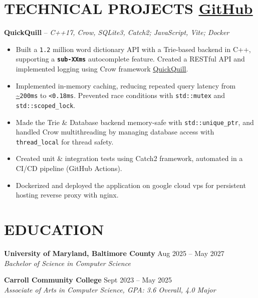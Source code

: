 \documentclass[11pt]{article}
\begin{document}
\section*{
TECHNICAL PROJECTS 
{\normalfont\normalsize\color{black}\underline{\href{https://github.com/NicholasSobchak}{GitHub}}}
}
\noindent\textbf{QuickQuill} -- \textit{C++17, Crow, SQLite3, Catch2; JavaScript, Vite; Docker}
\vspace{-2pt} %
\begin{itemize}[label=\texttt{\textbf{>}}]
  \item Built a \texttt{1.2} million word dictionary API with a Trie-based backend in C++, supporting a \texttt{\textbf{sub-XXms}} autocomplete feature. Created a RESTful API and implemented logging using Crow framework \underline{\href{https://quickquill.ink/}{QuickQuill}}.
  \item Implemented in-memory caching, reducing repeated query latency from \url{~}\texttt{200ms} to \texttt{<0.18ms}. Prevented race conditions with \texttt{std::mutex} and \texttt{std::scoped\_lock}.
  \item Made the Trie \& Database backend memory-safe with \texttt{std::unique\_ptr}, and handled Crow multithreading by managing database access with \texttt{thread\_local} for thread safety. 
  \item Created unit \& integration tests using Catch2 framework, automated in a CI/CD pipeline (GitHub Actions).
  \item Dockerized and deployed the application on google cloud vps for persistent hosting reverse proxy with nginx.
\end{itemize} 

\section*{EDUCATION}
\textbf{University of Maryland, Baltimore County} \hfill Aug 2025 -- May 2027\\
\textit{Bachelor of Science in Computer Science}

\textbf{Carroll Community College} \hfill Sept 2023 -- May 2025\\
\textit{Associate of Arts in Computer Science, GPA: 3.6 Overall, 4.0 Major}
\end{document}
